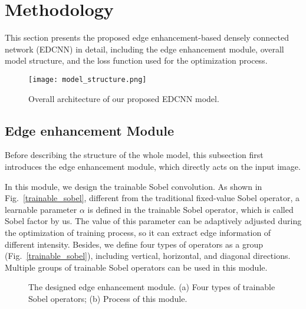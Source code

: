 \documentclass[conference]{IEEEtran}
\begin{document}
        \smallskip

    \section{Methodology}
        This section presents the proposed edge enhancement-based densely connected network (EDCNN) in detail, including the edge enhancement module, overall model structure, and the loss function used for the optimization process.
        
        \begin{figure*}[tp]
            \centering
            \texttt{[image: model\_structure.png]}
            \caption{Overall architecture of our proposed EDCNN model.}
            \label{model_structure}
        \end{figure*}

        \subsection{Edge enhancement Module} \label{methodology_section_A}
            Before describing the structure of the whole model, this subsection first introduces the edge enhancement module, which directly acts on the input image.
            
            In this module, we design the trainable Sobel convolution. 
            As shown in Fig.~\ref{trainable_sobel}, different from the traditional fixed-value Sobel operator\cite{sobel_operator}, a learnable parameter $\alpha$ is defined in the trainable Sobel operator, which is called Sobel factor by us.
            The value of this parameter can be adaptively adjusted during the optimization of training process, so it can extract edge information of different intensity.
            Besides, we define four types of operators as a group (Fig.~\ref{trainable_sobel}), including vertical, horizontal, and diagonal directions. 
            Multiple groups of trainable Sobel operators can be used in this module. 

            \begin{figure}[h]
                \hspace{0.05\linewidth}
                \caption{The designed edge enhancement module. (a) Four types of trainable Sobel operators; (b) Process of this module.}
                \label{trainable_sobel_and_edge_enhancement_module}
            \end{figure}
            
\end{document}
